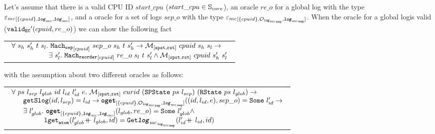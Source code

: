 \begin{lemma}
\label{lemma:chapter:conlink:separate-refines-reorder}
Let's assume that there is a valid CPU ID $start\_cpu$ ($start\_cpu \in {\mathbb{S}_{core}}$),
an oracle $re\_o$ for a global log with the type ${{{\varepsilon_{mc}}}_{[{\{cpuid\}}, {{{\mathrm{\texttt{\textbf{\textit{log}}}}}_{\mathrm{mc}}}}, {{{\mathrm{\texttt{\textbf{\textit{log}}}}}_{\mathrm{mc}}}}]}}$, and a oracle for a set of logs 
$sep\_o$ with the type ${{{\varepsilon_{mc}}}_{[{\{cpuid\}}, {{\mathcal{O}_{{{{\mathrm{\texttt{\textbf{\textit{log}}}}}_{\mathrm{mc}}}_{{\mathrm{\texttt{sep}}}}}}}}, {{{{\mathrm{\texttt{\textbf{\textit{log}}}}}_{\mathrm{mc}}}_{{\mathrm{\texttt{sep}}}}}}]}}$.
When the oracle for a global logis valid (${{{{\mathrm{\texttt{valid}}}_{{\mathrm{\texttt{EC}}}}}'}({cpuid}, {re\_o })}$) we can show the following fact
\begin{center}
\begin{tabular}{P{0.95\textwidth}}
$
\begin{array}{l}
\forall \ s_h \ s_h' \ t \ s_l . \ \singleseparatestep{cpuid}{sep\_o}{s_h}{t}{s_h'} \rightarrow  \matchspstaterstate{cpuid}{s_h}{s_l} \rightarrow \\
\ \ \ \ \ \ \ \ \ \ \ \ \ \ \ \ \exists\ s_l' . \  \singlereorderstep{cpuid}{re\_o}{s_l}{t}{s_l'} \wedge  \matchspstaterstate{cpuid}{s_h'}{s_l'}\\
\end{array}
$
\end{tabular}
\end{center}
with the assumption about two different oracles as follows:
\begin{center}
\begin{tabular}{P{0.95\textwidth}}
$
\begin{array}{l}
\forall \ ps \ l_{sep} \ l_{glob} \ id  \ l_{id} \ l_{id}' \ e .\ \matchspstaterstate{curid}{(\spstate{ps}{l_{sep}})}{(\rstate{ps}{l_{glob}})} \rightarrow \\
 \ \ \ \ \ \getseparatelog{id}{l_{sep}}{l_{id}} \rightarrow   \oget{\set{cpuid}}{\separateoraclelogtypekwd}{\separatelogtypekwd}{(id, l_{id}, e)}{sep\_o}{l_{id}'} \rightarrow \\
 \ \ \ \ \  \exists \ l_{glob}' .\ \oget{\set{cpuid}}{\mclog}{\mclog}{l_{glob}}{re\_o}{l_{glob}'} \wedge \\
 \ \ \ \ \ \ \ \ \ \  \ \ \ \ \loggetatom{\listapp{l_{glob}'}{l_{glob}}}{id}{\separatelogtwolognoeq{\listapp{l_{id}'}{l_{id}}}{id}} \\
\end{array}
$
\end{tabular}
\end{center}
\end{lemma}





